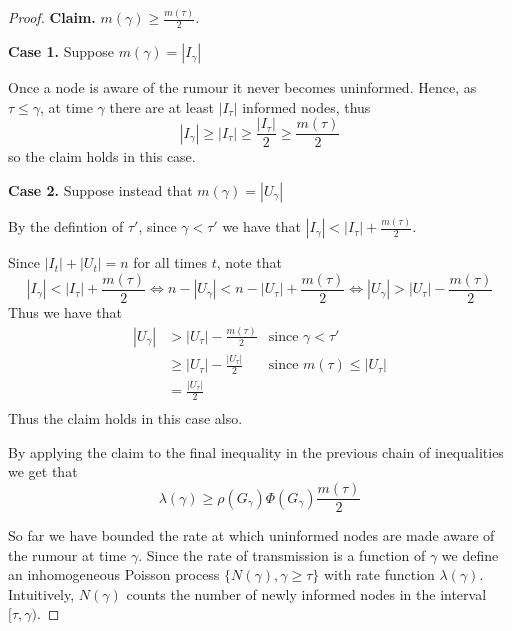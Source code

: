 \begin{proof}
	\textbf{Claim.} $m(\gamma) \geq \frac{m(\tau)}{2}$. %

	\textbf{Case 1.} Suppose $m(\gamma) = |I_\gamma|$

	\noindent
	Once a node is aware of the rumour it never becomes uninformed. Hence, as $\tau \leq \gamma$, at time $\gamma$ there are at least $|I_\tau|$ informed nodes, thus 
	$$
	|I_\gamma| \geq |I_\tau| \geq \frac{|I_\tau|}{2} \geq \frac{m(\tau)}{2}
	$$
	so the claim holds in this case.

	\textbf{Case 2.} Suppose instead that $m(\gamma) = |U_\gamma|$

	\noindent
	By the defintion of $\tau'$, since $\gamma < \tau'$ we have that $|I_{\gamma}| < |I_\tau| + \frac{m(\tau)}{2}$.

	Since $|I_t| + |U_t| = n$ for all times $t$, note that
	$$
		|I_{\gamma}| < |I_\tau| + \frac{m(\tau)}{2} 
		\iff
		n - |U_{\gamma}| < n - |U_\tau| + \frac{m(\tau)}{2} 
		\iff
		|U_\gamma| > |U_\tau| - \frac{m(\tau)}{2}
	$$
	Thus we have that
	\begin{align*}
		|U_\gamma| & > |U_\tau| - \frac{m(\tau)}{2} & \text{since }\gamma < \tau' \\
		& \geq |U_\tau| - \frac{|U_\tau|}{2} & \text{since } m(\tau) \leq |U_\tau| \\
		& = \frac{|U_\tau|}{2} \\
	\end{align*}
	Thus the claim holds in this case also.
	
	\noindent
	By applying the claim to the final inequality in the previous chain of inequalities we get that
	\begin{equation} \label{eq:RateBound}
		\lambda(\gamma) \geq \rho(G_\gamma)\Phi(G_\gamma)\frac{m(\tau)}{2}
	\end{equation}

	So far we have bounded the rate at which uninformed nodes are made aware of the rumour at time $\gamma$. Since the rate of transmission is a function of $\gamma$ we define an inhomogeneous Poisson process $\{N(\gamma), \gamma \geq \tau\}$ with rate function $\lambda(\gamma)$. %
	Intuitively, $N(\gamma)$ counts the number of newly informed nodes in the interval $[\tau,\gamma)$. %



\end{proof}

